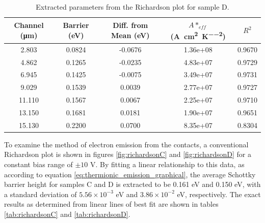 \begin{table}[h]
    \centering
    \begin{tabular}{|c|c|c|c|c|}
        \hline
        Channel (\si{\micro\metre}) & Barrier (\si{\electronvolt}) & Diff. from Mean (\si{\electronvolt}) & $A*_{eff}$ (\si{\ampere\per\centi\metre\squared\per\kelvin\squared}) & $R^{2}$\\ \hline
        2.803 & 0.0824 & -0.0676 & 1.36e+08 &0.9670 \\ 
        4.862 & 0.1265 & -0.0235 & 4.83e+07 &0.9729 \\  
        6.945 & 0.1425 & -0.0075 & 3.49e+07 &0.9731 \\ 
        9.029 & 0.1539 & 0.0039 & 2.77e+07 &0.9727 \\ 
        11.110 & 0.1567 & 0.0067 & 2.25e+07 &0.9710 \\ 
        13.150 & 0.1681 & 0.0181 & 1.90e+07 &0.9651 \\ 
        15.130 & 0.2200 & 0.0700 & 8.35e+07 &0.8304 \\ 
        \hline
    \end{tabular}
    \caption{Extracted parameters from the Richardson plot for sample D.}
    \label{tab:richardsonD_50V}
\end{table}

To examine the method of electron emission from the contacts, a conventional Richardson plot is shown in figures \ref{fig:richardsonC} and \ref{fig:richardsonD} for a constant bias range of $\pm10$ \si{\volt}. By fitting a linear relationship to this data, as according to equation \ref{eq:thermionic_emission_graphical}, the average Schottky barrier height for samples C and D is extracted to be 0.161 \si{\electronvolt} and 0.150 \si{\electronvolt}, with a standard deviation of $5.56\times10^{-3}$ \si{\electronvolt} and $3.86\times10^{-2}$ \si{\electronvolt}, respectively. The exact results as determined from linear lines of best fit are shown in tables \ref{tab:richardsonC} and \ref{tab:richardsonD}.

